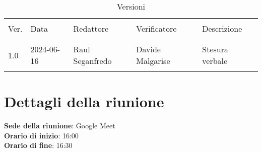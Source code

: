 \documentclass[italian,12pt]{article}
\begin{document}


\newpage



\begin{table}[!h]
	\caption{Versioni}
	\footnotesize
	\begin{center}
		\begin{tabular}{ l l l l p{6cm} }
			\hline                                                                           \\[-2ex]
			Ver. & Data       & Redattore       & Verificatore       & Descrizione           \\
			\\[-2ex] \hline \\[-1.5ex]
			1.0  & 2024-06-16 & Raul Seganfredo & Davide Malgarise & Stesura verbale \\
			\\[-1.5ex] \hline
		\end{tabular}
	\end{center}
\end{table}

\newpage

\tableofcontents

\newpage

\section{Dettagli della riunione}


\textbf{Sede della riunione}: Google Meet\\
\textbf{Orario di inizio}: 16:00\\
\textbf{Orario di fine}: 16:30\\
\end{document}
